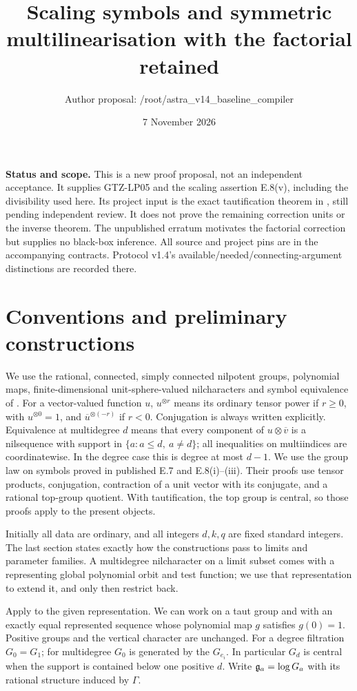 \documentclass[11pt]{article}
\title{Scaling symbols and symmetric multilinearisation with the factorial retained}
\author{Author proposal: /root/astra\_v14\_baseline\_compiler}
\date{7 November 2026}
\begin{document}
\maketitle
\noindent\textbf{Status and scope.} This is a new proof proposal, not an
independent acceptance. It supplies GTZ-LP05 and the scaling assertion
E.8(v), including the divisibility used here. Its project input is the exact
tautification theorem in \cite{TAUT}, still pending independent review.
It does not prove the remaining correction units or the inverse theorem.
The unpublished erratum motivates the factorial correction but supplies no
black-box inference. All source and project pins are in the accompanying
contracts. Protocol v1.4's available/needed/connecting-argument distinctions
are recorded there.

\section{Conventions and preliminary constructions}\label{sec:setup}
We use the rational, connected, simply connected nilpotent groups,
polynomial maps, finite-dimensional unit-sphere-valued nilcharacters and
symbol equivalence of \cite[Sections 3--6 and Appendix E]{GTZ}.
For a vector-valued function $u$, $u^{\otimes r}$ means its ordinary tensor
power if $r\geq0$, with $u^{\otimes0}=1$, and
$\overline u^{\otimes(-r)}$ if $r<0$.
Conjugation is always written explicitly. Equivalence at multidegree $d$
means that every component of $u\otimes\overline v$ is a nilsequence with
support in $\{a:a\leq d,\ a\ne d\}$; all inequalities on multiindices
are coordinatewise. In the degree case this is degree at most $d-1$.
We use the group law on symbols proved in published E.7 and E.8(i)--(iii).
Their proofs use tensor products, conjugation, contraction of a unit vector
with its conjugate, and a rational top-group quotient. With tautification,
the top group is central, so those proofs apply to the present objects.

Initially all data are ordinary, and all integers $d,k,q$ are fixed standard
integers. The last section states exactly how the constructions pass to
limits and parameter families. A multidegree nilcharacter on a limit subset
comes with a representing global polynomial orbit and test function; we
use that representation to extend it, and only then restrict back.

Apply \cite[Theorem 1 and Corollary 2]{TAUT} to the given representation.
We can work on a taut group and with an exactly equal represented sequence
whose polynomial map $g$ satisfies $g(0)=1$. Positive groups and the
vertical character are unchanged. For a degree filtration $G_0=G_1$;
for multidegree $G_0$ is generated by the $G_{e_i}$. In particular $G_d$
is central when the support is contained below one positive $d$.
Write $\mathfrak g_a=\log G_a$ with its rational structure induced by $\Gamma$.
\end{document}
